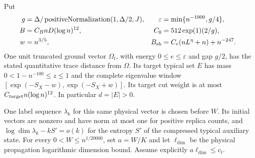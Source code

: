 \begin{lemma}
    Put
    \begin{align}
        g           & =\Delta/\operatorname{positiveNormalization}(1,\Delta/2,J), &
        \varepsilon & =\min\{n^{-1000},g/4\},\nonumber                                                                     \\
        B           & =C_BnD(\log n)^{12},                                        &
        C_0         & =512\exp(1)(2/g),\nonumber                                                                           \\
        w           & =n^{3/5},                                                   & B_{\rm sh} & =C_e(nL^\eta+n)+n^{-247}.
        \label{eq:arealaw-source-selected-budgets}
    \end{align}
    One unit truncated ground vector $\Omega_t$, with energy
    $0\le e\le\varepsilon$ and gap $g/2$, has the stated quantitative
    trace distance from $\Omega$. Its target typical set $E$
    has mass $0<1-n^{-100}\le z\le1$ and the complete eigenvalue window
    $[\exp(-S_X-w),\exp(-S_X+w)]$. Its target cut weight is at most
    $C_{\rm target}n(\log n)^{12}$. In particular $d=|E|>0$.

    One label sequence $\lambda_k$ for this same physical vector is
    chosen before $W$. Its initial vectors are nonzero and have norm at
    most one for positive replica counts, and
    $\log\dim\lambda_k-kS'=o(k)$ for the entropy $S'$ of the
    compressed typical auxiliary state. For every
    $0<W\le n^{1/20000}$, set $a=W/K$ and let
    $\ell_{\dim}$ be the physical propagation logarithmic dimension
    bound. Assume explicitly $a\ell_{\dim}\le c_t$.


\end{lemma}
